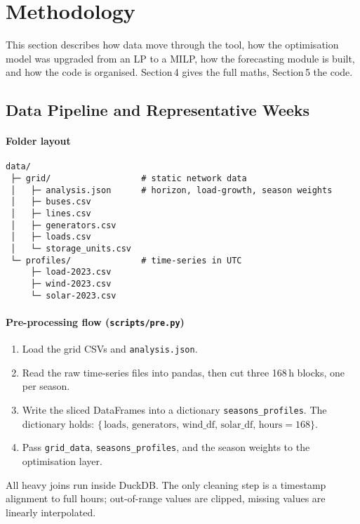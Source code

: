 \newpage
\section{Methodology}

This section describes how data move through the tool, how the optimisation model was upgraded from an 
LP to a MILP, how the forecasting module is built, and how the code is organised.  Section\,4 gives the 
full maths, Section\,5 the code.

\subsection{Data Pipeline and Representative Weeks}

\paragraph{Folder layout}

\begin{verbatim}
data/
 ├─ grid/                  # static network data
 │   ├─ analysis.json      # horizon, load-growth, season weights
 │   ├─ buses.csv
 │   ├─ lines.csv
 │   ├─ generators.csv
 │   ├─ loads.csv
 │   └─ storage_units.csv
 └─ profiles/              # time-series in UTC
     ├─ load-2023.csv
     ├─ wind-2023.csv
     └─ solar-2023.csv
\end{verbatim}

\paragraph{Pre-processing flow (\texttt{scripts/pre.py})}

\begin{enumerate}
\item Load the grid CSVs and \texttt{analysis.json}.  
\item Read the raw time-series files into pandas, then cut three
      168\,h blocks, one per season.  
\item Write the sliced DataFrames into a dictionary \texttt{seasons\_profiles}.  
      The dictionary holds:
      \(\{\,\text{loads},\,\text{generators},\,\text{wind\_df},\,\text{solar\_df},\,\text{hours}=168\}\).  
\item Pass \texttt{grid\_data}, \texttt{seasons\_profiles}, and the season weights
      to the optimisation layer.
\end{enumerate}

All heavy joins run inside DuckDB.
The only cleaning step is a timestamp alignment to full hours; out-of-range
values are clipped, missing values are linearly interpolated.

